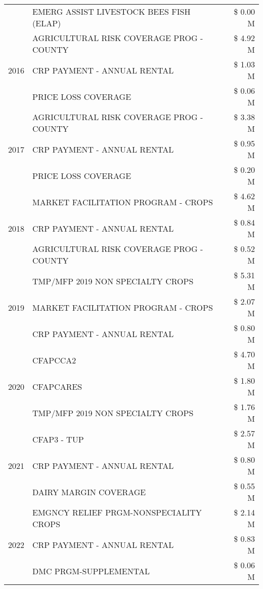 \begin{tabular}{llr}
 & EMERG ASSIST LIVESTOCK BEES FISH (ELAP) & \$ 0.00 M \\
\cline{1-3}
\multirow[t]{3}{*}{2016} & AGRICULTURAL RISK COVERAGE PROG - COUNTY & \$ 4.92 M \\
 & CRP PAYMENT - ANNUAL RENTAL & \$ 1.03 M \\
 & PRICE LOSS COVERAGE & \$ 0.06 M \\
\cline{1-3}
\multirow[t]{3}{*}{2017} & AGRICULTURAL RISK COVERAGE PROG - COUNTY & \$ 3.38 M \\
 & CRP PAYMENT - ANNUAL RENTAL & \$ 0.95 M \\
 & PRICE LOSS COVERAGE & \$ 0.20 M \\
\cline{1-3}
\multirow[t]{3}{*}{2018} & MARKET FACILITATION PROGRAM - CROPS & \$ 4.62 M \\
 & CRP PAYMENT - ANNUAL RENTAL & \$ 0.84 M \\
 & AGRICULTURAL RISK COVERAGE PROG - COUNTY & \$ 0.52 M \\
\cline{1-3}
\multirow[t]{3}{*}{2019} & TMP/MFP 2019 NON SPECIALTY CROPS & \$ 5.31 M \\
 & MARKET FACILITATION PROGRAM - CROPS & \$ 2.07 M \\
 & CRP PAYMENT - ANNUAL RENTAL & \$ 0.80 M \\
\cline{1-3}
\multirow[t]{3}{*}{2020} & CFAPCCA2 & \$ 4.70 M \\
 & CFAPCARES & \$ 1.80 M \\
 & TMP/MFP 2019 NON SPECIALTY CROPS & \$ 1.76 M \\
\cline{1-3}
\multirow[t]{3}{*}{2021} & CFAP3 - TUP & \$ 2.57 M \\
 & CRP PAYMENT - ANNUAL RENTAL & \$ 0.80 M \\
 & DAIRY MARGIN COVERAGE & \$ 0.55 M \\
\cline{1-3}
\multirow[t]{3}{*}{2022} & EMGNCY RELIEF PRGM-NONSPECIALITY CROPS & \$ 2.14 M \\
 & CRP PAYMENT - ANNUAL RENTAL & \$ 0.83 M \\
 & DMC PRGM-SUPPLEMENTAL & \$ 0.06 M \\
\cline{1-3}
\bottomrule
\end{tabular}
